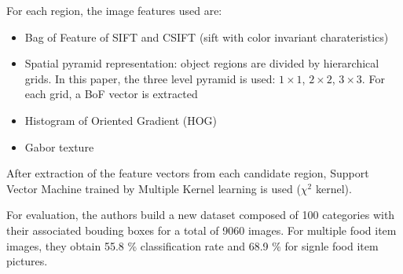 For each region, the image features used are:
\begin{itemize}
    \item Bag of Feature of SIFT and CSIFT (sift with color invariant charateristics)
    \item Spatial pyramid representation: object regions are divided by hierarchical grids. In this paper, the three level pyramid is used: $1 \times 1$, $2 \times 2$, $3 \times 3$. For each grid, a BoF vector is extracted
    \item Histogram of Oriented Gradient (HOG)
    \item Gabor texture
\end{itemize}

After extraction of the feature vectors from each candidate region, Support Vector Machine trained by Multiple Kernel learning is used ($\chi^2$ kernel).

For evaluation, the authors build a new dataset composed of 100 categories with their associated bouding boxes for a total of 9060 images. For multiple food item images, they obtain 55.8 \% classification rate and 68.9 \% for signle food item pictures.
